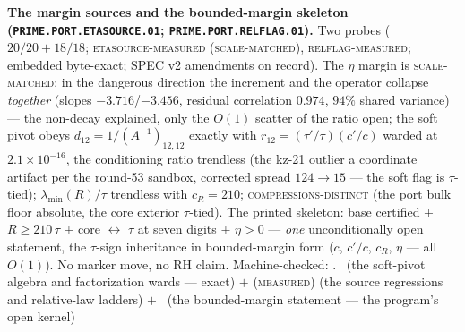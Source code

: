 \documentclass[11pt,a4paper]{article}
\theoremstyle{definition}
\begin{document}
\par\smallskip\noindent\textbf{The margin sources and the
bounded-margin skeleton
(\texttt{PRIME.PORT.\allowbreak ETASOURCE.01};
\texttt{PRIME.PORT.\allowbreak RELFLAG.01}).}
Two probes ($20/20 + 18/18$; \textsc{etasource-measured
(scale-matched)}, \textsc{relflag-measured}; embedded
byte-exact; SPEC v2 amendments on record).  The $\eta$ margin
is \textsc{scale-matched}: in the dangerous direction the
increment and the operator collapse \emph{together} (slopes
$-3.716$/$-3.456$, residual correlation $0.974$, $94\%$ shared
variance) --- the non-decay explained, only the $O(1)$ scatter
of the ratio open; the soft pivot obeys $d_{12} =
1/(A^{-1})_{12,12}$ exactly with $r_{12} =
(\tau'/\tau)(c'/c)$ warded at $2.1\times10^{-16}$, the
conditioning ratio trendless (the kz-21 outlier a coordinate
artifact per the round-53 sandbox, corrected spread $124 \to
15$ --- the soft flag is $\tau$-tied);
$\lambda_{\min}(R)/\tau$ trendless with $c_R = 210$;
\textsc{compressions-distinct} (the port bulk floor absolute,
the core exterior $\tau$-tied).  The printed skeleton: base
certified $+$ $R \ge 210\,\tau$ $+$ core $\leftrightarrow$
$\tau$ at seven digits $+$ $\eta > 0$ --- \emph{one}
unconditionally open statement, the $\tau$-sign inheritance in
bounded-margin form ($c$, $c'/c$, $c_R$, $\eta$ --- all
$O(1)$).  No marker move, no RH claim.
Machine-checked: .
\mE\ (the soft-pivot algebra and factorization wards ---
exact) $+$ (\textsc{measured}) (the source regressions and
relative-law ladders) $+$ \mO\ (the bounded-margin statement
--- the program's open kernel)
\par\smallskip
\end{document}
